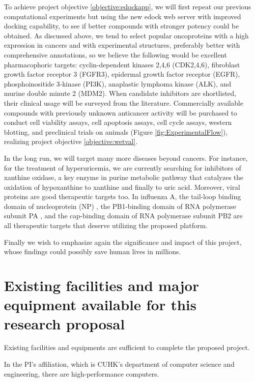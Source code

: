 \documentclass[a4paper,12pt]{article}
\begin{document}
To achieve project objective \ref{objective:edockapp}, we will first repeat our previous computational experiments but using the new edock web server with improved docking capability, to see if better compounds with stronger potency could be obtained. As discussed above, we tend to select popular oncoproteins with a high expression in cancers and with experimental structures, preferably better with comprehensive annotations, so we believe the following would be excellent pharmacophoric targets: cyclin-dependent kinases 2,4,6 (CDK2,4,6), fibroblast growth factor receptor 3 (FGFR3), epidermal growth factor receptor (EGFR), phosphoinositide 3-kinase (PI3K), anaplastic lymphoma kinase (ALK), and murine double minute 2 (MDM2). When candidate inhibitors are shortlisted, their clinical usage will be surveyed from the literature. Commercially available compounds with previously unknown anticancer activity will be purchased to conduct cell viability assays, cell apoptosis assays, cell cycle assays, western blotting, and preclinical trials on animals (Figure \ref{fig:ExperimentalFlow}), realizing project objective \ref{objective:wetval}.

In the long run, we will target many more diseases beyond cancers. For instance, for the treatment of hyperuricemia, we are currently searching for inhibitors of xanthine oxidase, a key enzyme in purine metabolic pathway that catalyzes the oxidation of hypoxanthine to xanthine and finally to uric acid. Moreover, viral proteins are good therapeutic targets too. In influenza A, the tail-loop binding domain of nucleoprotein (NP) \citep{1140,1231}, the PB1-binding domain of RNA polymerase subunit PA \citep{1540,1141}, and the cap-binding domain of RNA polymerase subunit PB2 \citep{1192} are all therapeutic targets that deserve utilizing the proposed platform.

Finally we wish to emphasize again the significance and impact of this project, whose findings could possibly save human lives in millions.

\newpage
\section*{Existing facilities and major equipment available for this research proposal}

Existing facilities and equipments are sufficient to complete the proposed project.

In the PI's affiliation, which is CUHK's department of computer science and engineering, there are high-performance computers.
\end{document}
